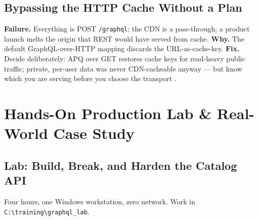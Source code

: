 \subsection{Bypassing the HTTP Cache Without a Plan}
\textbf{Failure.} Everything is POST \texttt{/graphql}; the CDN is a
pass-through; a product launch melts the origin that REST would have
served from cache. \textbf{Why.} The default GraphQL-over-HTTP mapping
discards the URL-as-cache-key. \textbf{Fix.} Decide deliberately: APQ
over GET restores cache keys for read-heavy public traffic; private,
per-user data was never CDN-cacheable anyway --- but know which you are
serving before you choose the transport \cite{rfc9110}.

\section{Hands-On Production Lab \& Real-World Case Study}
\label{sec:ch12-lab}

\subsection{Lab: Build, Break, and Harden the Catalog API}

Four hours, one Windows workstation, zero network. Work in
\texttt{C:\textbackslash{}training\textbackslash{}graphql\_lab}.


